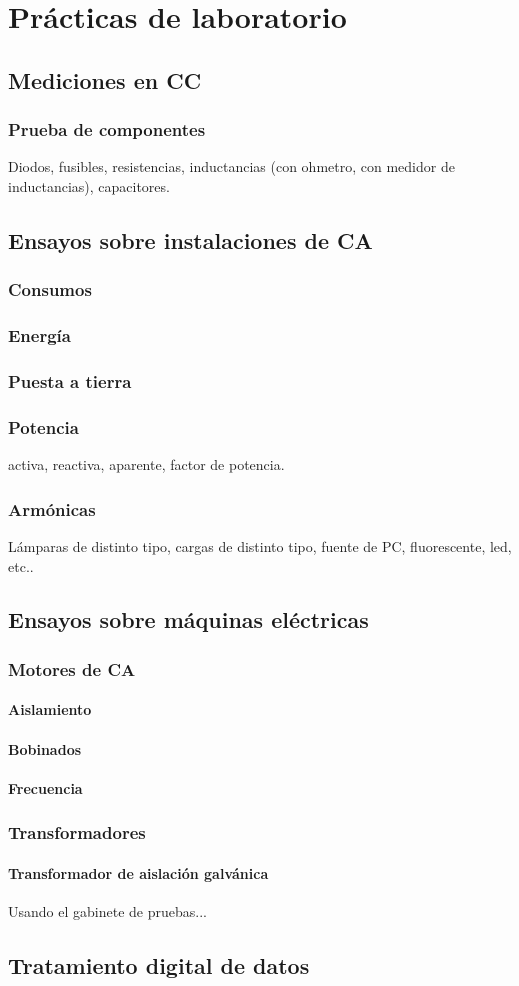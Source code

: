 \chapter{Prácticas de laboratorio}

\section{Mediciones en CC}
\subsection{Prueba de componentes}
Diodos, fusibles, resistencias, inductancias (con ohmetro, con medidor de inductancias), capacitores.
\section{Ensayos sobre instalaciones de CA}
\subsection{Consumos}
\subsection{Energía}
\subsection{Puesta a tierra}
\subsection{Potencia}
activa, reactiva, aparente, factor de potencia.
\subsection{Armónicas}
Lámparas de distinto tipo, cargas de distinto tipo, fuente de PC, fluorescente, led, etc..

\section{Ensayos sobre máquinas eléctricas}
\subsection{Motores de CA}
\subsubsection{Aislamiento}
\subsubsection{Bobinados}
\subsubsection{Frecuencia}
\subsection{Transformadores}
	\subsubsection{Transformador de aislación galvánica}
	Usando el gabinete de pruebas...
\section{Tratamiento digital de datos}